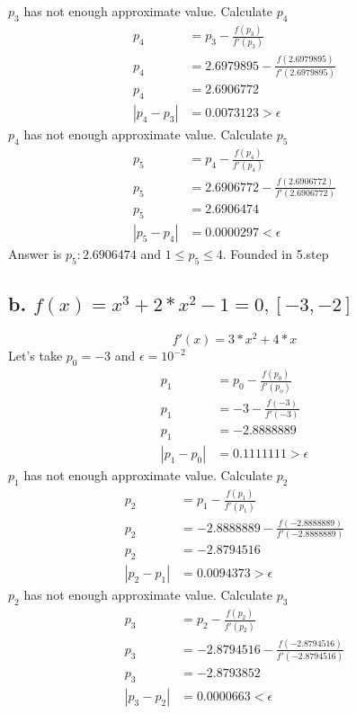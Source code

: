 \documentclass{article}
\begin{document}
$p_3$ has not enough approximate value. Calculate $p_4$
\begin{align}
\label{2.3.5.a.13}p_4 & = p_3 - \frac{f(p_3)}{f'(p_3)}\\
\label{2.3.5.a.14}p_4 & = 2.6979895 - \frac{f(2.6979895)}{f'(2.6979895)}\\
\label{2.3.5.a.15}p_4 & = 2.6906772\\
\label{2.3.5.a.16}|p_4-p_3| & =0.0073123 > \epsilon
\end{align}
$p_4$ has not enough approximate value. Calculate $p_5$
\begin{align}
\label{2.3.5.a.17}p_5 & = p_4 - \frac{f(p_4)}{f'(p_4)}\\
\label{2.3.5.a.18}p_5 & = 2.6906772 - \frac{f(2.6906772)}{f'(2.6906772)}\\
\label{2.3.5.a.19}p_5 & = 2.6906474\\
\label{2.3.5.a.20}|p_5-p_4| & =0.0000297 < \epsilon
\end{align}
Answer is $p_5:2.6906474$ and $1\leq p_5 \leq 4$. Founded in 5.step

\subsection{b. $f(x)=x^3+2*x^2-1 = 0, [-3, -2]$}
\begin{equation}
f'(x)=3*x^2+4*x
\end{equation}
Let's take $p_0=-3$ and $\epsilon=10^{-2}$
\begin{align}
\label{2.3.5.b.1}p_1 & = p_0 - \frac{f(p_0)}{f'(p_o)}\\
\label{2.3.5.b.2}p_1 & = -3 - \frac{f(-3)}{f'(-3)}\\
\label{2.3.5.b.3}p_1 & = -2.8888889\\
\label{2.3.5.b.4}|p_1-p_0| & =0.1111111 > \epsilon
\end{align}
$p_1$ has not enough approximate value. Calculate $p_2$
\begin{align}
\label{2.3.5.b.1}p_2 & = p_1 - \frac{f(p_1)}{f'(p_1)}\\
\label{2.3.5.b.2}p_2 & = -2.8888889 - \frac{f(-2.8888889)}{f'(-2.8888889)}\\
\label{2.3.5.b.3}p_2 & = -2.8794516\\
\label{2.3.5.b.4}|p_2-p_1| & =0.0094373 > \epsilon
\end{align}
$p_2$ has not enough approximate value. Calculate $p_3$
\begin{align}
\label{2.3.5.b.1}p_3 & = p_2 - \frac{f(p_2)}{f'(p_2)}\\
\label{2.3.5.b.2}p_3 & = -2.8794516 - \frac{f(-2.8794516)}{f'(-2.8794516)}\\
\label{2.3.5.b.3}p_3 & = -2.8793852\\
\label{2.3.5.b.4}|p_3-p_2| & =0.0000663 < \epsilon
\end{align}
\end{document}
